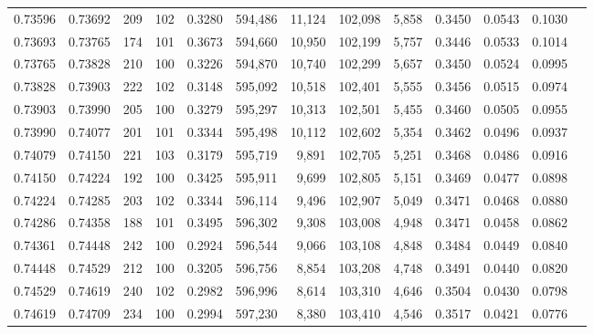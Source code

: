 \begin{tabular}{rrrrrrrrrrrrr}
0.73596 & 0.73692 &   209 & 102 &                                     0.3280 & 594,486 &  11,124 & 102,098 &   5,858 & 0.3450 & 0.0543 & 0.1030 \\
0.73693 & 0.73765 &   174 & 101 &                                     0.3673 & 594,660 &  10,950 & 102,199 &   5,757 & 0.3446 & 0.0533 & 0.1014 \\
0.73765 & 0.73828 &   210 & 100 &                                     0.3226 & 594,870 &  10,740 & 102,299 &   5,657 & 0.3450 & 0.0524 & 0.0995 \\
0.73828 & 0.73903 &   222 & 102 &                                     0.3148 & 595,092 &  10,518 & 102,401 &   5,555 & 0.3456 & 0.0515 & 0.0974 \\
0.73903 & 0.73990 &   205 & 100 &                                     0.3279 & 595,297 &  10,313 & 102,501 &   5,455 & 0.3460 & 0.0505 & 0.0955 \\
0.73990 & 0.74077 &   201 & 101 &                                     0.3344 & 595,498 &  10,112 & 102,602 &   5,354 & 0.3462 & 0.0496 & 0.0937 \\
0.74079 & 0.74150 &   221 & 103 &                                     0.3179 & 595,719 &   9,891 & 102,705 &   5,251 & 0.3468 & 0.0486 & 0.0916 \\
0.74150 & 0.74224 &   192 & 100 &                                     0.3425 & 595,911 &   9,699 & 102,805 &   5,151 & 0.3469 & 0.0477 & 0.0898 \\
0.74224 & 0.74285 &   203 & 102 &                                     0.3344 & 596,114 &   9,496 & 102,907 &   5,049 & 0.3471 & 0.0468 & 0.0880 \\
0.74286 & 0.74358 &   188 & 101 &                                     0.3495 & 596,302 &   9,308 & 103,008 &   4,948 & 0.3471 & 0.0458 & 0.0862 \\
0.74361 & 0.74448 &   242 & 100 &                                     0.2924 & 596,544 &   9,066 & 103,108 &   4,848 & 0.3484 & 0.0449 & 0.0840 \\
0.74448 & 0.74529 &   212 & 100 &                                     0.3205 & 596,756 &   8,854 & 103,208 &   4,748 & 0.3491 & 0.0440 & 0.0820 \\
0.74529 & 0.74619 &   240 & 102 &                                     0.2982 & 596,996 &   8,614 & 103,310 &   4,646 & 0.3504 & 0.0430 & 0.0798 \\
0.74619 & 0.74709 &   234 & 100 &                                     0.2994 & 597,230 &   8,380 & 103,410 &   4,546 & 0.3517 & 0.0421 & 0.0776 \\

\end{tabular}
